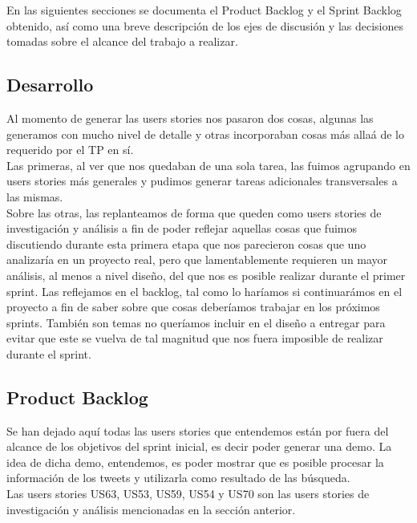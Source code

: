 En las siguientes secciones se documenta el Product Backlog y el Sprint Backlog obtenido, así como una breve descripción de los ejes de discusión y las decisiones tomadas sobre el alcance del trabajo a realizar.\\


\subsection{Desarrollo}
Al momento de generar las users stories nos pasaron dos cosas, algunas las generamos con mucho nivel de detalle y otras incorporaban cosas m\'as alla\'a de lo requerido por el TP en sí.\\
Las primeras, al ver que nos quedaban de una sola tarea, las fuimos agrupando en users stories más generales y pudimos generar tareas adicionales transversales a las mismas.\\
Sobre las otras, las replanteamos de forma que queden como users stories de investigación y análisis a fin de poder reflejar aquellas cosas que fuimos discutiendo durante esta primera etapa que nos parecieron cosas que uno analizar\'ia en un proyecto real, pero que lamentablemente requieren un mayor análisis, al menos a nivel diseño, del que nos es posible realizar durante el primer sprint. Las reflejamos en el backlog, tal como lo har\'iamos si continuar\'amos en el proyecto a fin de saber sobre que cosas deber\'iamos trabajar en los pr\'oximos sprints. Tambi\'en son temas no quer\'iamos incluir en el dise\~no a entregar para evitar que este se vuelva de tal magnitud que nos fuera imposible de realizar durante el sprint. 

\subsection{Product Backlog}
Se han dejado aquí todas las users stories que entendemos están por fuera del alcance de los objetivos del sprint inicial, es decir poder generar una demo. La idea de dicha demo, entendemos, es poder mostrar que es posible procesar la información de los tweets y utilizarla como resultado de las búsqueda. \\
Las users stories US63, US53, US59, US54 y US70 son las users stories de investigación y análisis mencionadas en la sección anterior.\\
\newpage



